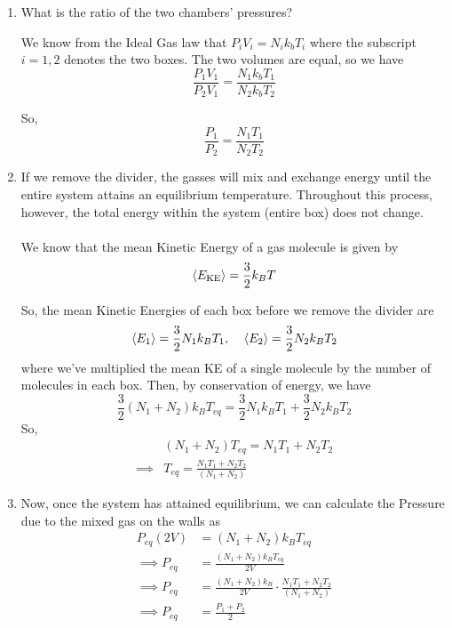 \documentclass[twoside]{article}
\begin{document}
\begin{enumerate}[label=(\alph*)]
   \item What is the ratio of the two chambers' pressures?
   
   We know from the Ideal Gas law that $P_i V_i = N_i k_b T_i$ where the subscript $i=1,2$ denotes the two boxes. The two volumes are equal, so we have 
   \[  \frac{P_1 V_1}{P_2 V_1} = \frac{N_1 k_b T_1}{N_2 k_b T_2} \]

   So,
   \[ \boxed{\frac{P_1}{P_2} = \frac{N_1 T_1}{N_2 T_2}} \]

   \item If we remove the divider, the gasses will mix and exchange energy until the entire system attains an equilibrium temperature. Throughout this process, however, the total energy within the system (entire box) does not change. 
   \\
   \\
   We know that the mean Kinetic Energy of a gas molecule is given by 
   \[ \langle E_{\text{KE}} \rangle = \frac{3}{2}k_B T \]  

   So, the mean Kinetic Energies of each box before we remove the divider are
   \[ \langle E_1 \rangle = \frac{3}{2}N_1 k_B T_1,\;\;\;\; \langle E_2 \rangle = \frac{3}{2}N_2 k_B T_2\]
   where we've multiplied the mean KE of a single molecule by the number of molecules in each box. Then, by conservation of energy, we have 
   \[ \frac{3}{2}(N_1 + N_2) k_B T_{eq} = \frac{3}{2}N_1 k_B T_1 + \frac{3}{2}N_2 k_B T_2 \]
   So,
   \begin{align*}
      &(N_1 + N_2)T_{eq} = N_1 T_1  +  N_2 T_2 \\
      \implies & \boxed{T_{eq} = \frac{N_1 T_1  +  N_2 T_2}{(N_1 + N_2)} }
   \end{align*}

   \item Now, once the system has attained equilibrium, we can calculate the Pressure due to the mixed gas on the walls as 
   \begin{align*}
      P_{eq}(2V) &= (N_1 + N_2) k_B T_{eq} \\
      \implies P_{eq} &= \frac{(N_1 + N_2) k_B T_{eq}}{2V} \\
      \implies P_{eq} &= \frac{(N_1 + N_2) k_B}{2V} \cdot \frac{N_1 T_1  +  N_2 T_2}{(N_1 + N_2)} \\
      \implies P_{eq} &= \frac{P_1 + P_2}{2}
   \end{align*}


\end{enumerate}
\end{document}

